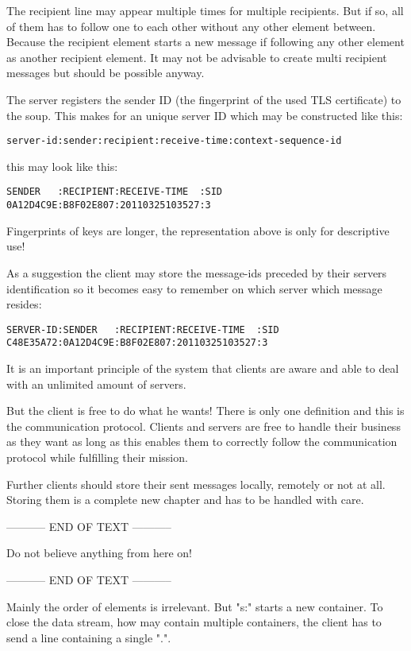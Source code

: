 \documentclass[twoside,a4paper,english,12pt,authoryear,openright]{book}
\begin{document}
The recipient line may appear multiple times for multiple recipients. But if so, all of them has to follow one to each other without any other element between. Because the recipient element starts a new message if following any other element as another recipient element. It may not be advisable to create multi recipient messages but should be possible anyway.

The server registers the sender ID (the fingerprint of the used TLS certificate) to the soup. This makes for an unique server ID which may be constructed like this:

\texttt{server-id:sender:recipient:receive-time:context-sequence-id}

this may look like this:

\begin{lstlisting}
SENDER   :RECIPIENT:RECEIVE-TIME  :SID
0A12D4C9E:B8F02E807:20110325103527:3
\end{lstlisting}

Fingerprints of keys are longer, the representation above is only for descriptive use!

As a suggestion the client may store the message-ids preceded  by their servers identification so it becomes easy to remember on which server which message resides: 

\begin{lstlisting}
SERVER-ID:SENDER   :RECIPIENT:RECEIVE-TIME  :SID
C48E35A72:0A12D4C9E:B8F02E807:20110325103527:3
\end{lstlisting}

It is an important principle of the system that clients are aware and able to deal with an unlimited amount of servers.

But the client is free to do what he wants! There is only one definition and this is the communication protocol. Clients and servers are free to handle their business as they want as long as this enables them to correctly follow the communication protocol while fulfilling their mission.

Further clients should store their sent messages locally, remotely or not at all. Storing them is a complete new chapter and has to be handled with care.



----------- END OF TEXT -----------

Do not believe anything from here on!

----------- END OF TEXT -----------

Mainly the order of elements is irrelevant. But "s:" starts a new container. To close the data stream, how may contain multiple containers, the client has to send a line containing a single ".".
\end{document}
